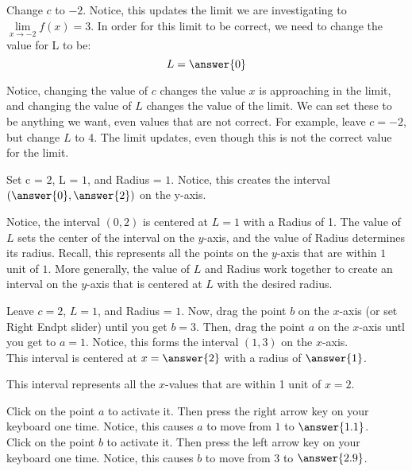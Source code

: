 \documentclass{ximera}
\begin{document}
\begin{exercise}
    \begin{question}
   	  Change $ c $ to $-2$.  Notice, this updates the limit we are investigating to $\lim\limits_{x \to -2}f(x)=3$.  In order for this limit to be correct, we need to change the value for L to be: 
   	  \[
   	      L=\answer{0}
   	  \]
   	  \begin{feedback}
   	  	Notice, changing the value of $ c $ changes the value $x$ is approaching in the limit, and changing the value of $L$ changes the value of the limit.  We can set these to be anything we want, even values that are not correct.  For example, leave $ c=-2 $, but change $ L $ to 4.  The limit updates, even though this is not the correct value for the limit.
   	  \end{feedback}
      \begin{question}
      	Set c = $2$, L = $1$, and Radius = $1$.  Notice, this creates the interval $\left(\answer{0}, \answer{2}\right)$ on the y-axis.
      	\begin{feedback}
      		Notice, the interval $(0,2)$ is centered at $L=1$ with a Radius of 1.  The value of $ L $ sets the center of the interval on the $y$-axis, and the value of Radius determines its radius.  Recall, this represents all the points on the $y$-axis that are within $1$ unit of $1$.  More generally, the value of $ L $ and Radius work together to create an interval on the $y$-axis that is centered at $ L $ with the desired radius.
      	\end{feedback}
        \begin{question}
        	Leave $c=2$, $L = 1$, and Radius = $1$.  Now, drag the point $b$ on the $x$-axis (or set Right Endpt slider) until you get $b=3$.  Then, drag the point $a$ on the $x$-axis untl you get to $a=1$.  Notice, this forms the interval $(1,3)$ on the $x$-axis. \\
        	This interval is centered at $x=\answer{2}$ with a radius of $\answer{1}$.
        	\begin{feedback}
        		This interval represents all the $x$-values that are within 1 unit of $x=2$.
        	\end{feedback}
        	\begin{question}
        		Click on the point $a$ to activate it.  Then press the right arrow key on your keyboard one time.  Notice, this causes $a$ to move from $1$ to $\answer{1.1}$.\\
        		Click on the point $b$ to activate it.  Then press the left arrow key on your keyboard one time.  Notice, this causes $b$ to move from $3$ to $\answer{2.9}$.\\

\end{question}
\end{question}
\end{question}
\end{question}
\end{exercise}
\end{document}
